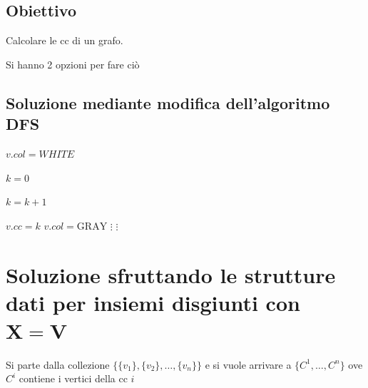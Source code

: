 \subsection{Obiettivo}
Calcolare le cc di un grafo.

Si hanno 2 opzioni per fare ciò

\subsection{Soluzione mediante modifica dell'algoritmo DFS}
\begin{minipage}{0.45\textwidth}
    \begin{algorithmic}
                \State $v.col=WHITE$
            \EndFor

            \State $k=0$

                    \State $k=k+1$
                    \State {}
                \EndIf
            \EndFor
        \EndProcedure
    \end{algorithmic}
\end{minipage}
\hfill
\begin{minipage}{0.45\textwidth}
    \begin{algorithmic}
            \State $\boxed{v.cc = k}$
            \State $v.col = \text{GRAY}$
            \State $\vdots$
                \State $\vdots$
                \State {}
            \EndFor
        \EndProcedure
    \end{algorithmic}
\end{minipage}

\section{Soluzione sfruttando le strutture dati per insiemi disgiunti con $\mathbf{X=V}$}

Si parte dalla collezione $\{\{v_1\},\{v_2\}, \dots, \{v_n\}\}$ e si vuole arrivare a $\{C^1, \dots, C^n\}$ ove $C^i$ contiene i vertici della cc $i$

